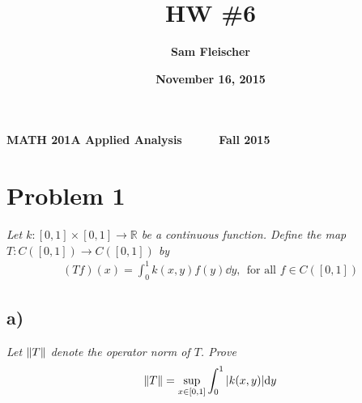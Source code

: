\documentclass[12pt]{article}
\title{\bf HW \#6}
\author{\bf Sam Fleischer}
\date{\bf November 16, 2015}
\theoremstyle{plain}
\begin{document}
{\bf MATH 201A \hfill Applied Analysis \ \ \ \ \ \hfill Fall 2015} 

{\let\newpage\relax\maketitle}

\section*{Problem 1}
\emph{Let $k : [0,1]\times[0,1]\rightarrow \mathbb{R}$ be a continuous function.  Define the map $T:C([0,1])\rightarrow C([0,1])$ by}
\begin{align*}
    (Tf)(x) = \int_0^1 k(x,y)f(y)\dd y,\ \ \text{for all } f \in C([0,1])
\end{align*}

\subsection*{ a)}
\emph{Let $\norm{T}$ denote the operator norm of $T$.  Prove}
\begin{equation}
    \label{eq_2}
    \norm{T} = \sup\limits_{x\in[0,1]}\int_0^1|k(x,y)|\dd y
\end{equation}
\end{document}
